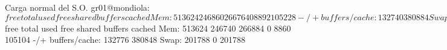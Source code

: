 \begin{envCodigo}
Carga normal del S.O.
gr01@mondiola:~$ free
             total       used       free     shared    buffers     cached
Mem:        513624     246860     266764          0       8892     105228
-/+ buffers/cache:     132740     380884
Swap:       201788          0     201788


Agregando a la linea del kernel en el grub mem=510M@64M
gr01@mondiola:~$ free
             total       used       free     shared    buffers     cached
Mem:        513624     246740     266884          0       8860     105104
-/+ buffers/cache:     132776     380848
Swap:       201788          0     201788
\end{envCodigo}
